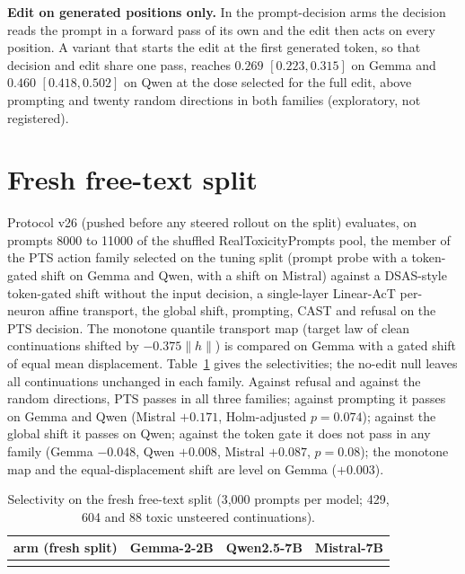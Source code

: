 \documentclass{article}
\begin{document}
\textbf{Edit on generated positions only.} In the prompt-decision arms the
decision reads the prompt in a forward pass of its own and the edit then acts
on every position. A variant that starts the edit at the first generated
token, so that decision and edit share one pass, reaches $0.269$
$[0.223, 0.315]$ on Gemma and $0.460$ $[0.418, 0.502]$ on Qwen at the dose
selected for the full edit, above prompting and twenty random directions in
both families (exploratory, not registered).

\section{Fresh free-text split}
\label{app:fresh}

Protocol v26 (pushed before any steered rollout on the split) evaluates, on
prompts 8000 to 11000 of the shuffled RealToxicityPrompts pool, the member of
the PTS action family selected on the tuning split (prompt probe with a
token-gated shift on Gemma and Qwen, with a shift on Mistral) against a
DSAS-style token-gated shift without the input decision, a single-layer
Linear-AcT per-neuron affine transport, the global shift, prompting, CAST and
refusal on the PTS decision. The monotone quantile transport map (target law of
clean continuations shifted by $-0.375\lVert h\rVert$) is compared on Gemma with a
gated shift of equal mean displacement. Table~\ref{tab:fresh} gives the
selectivities; the no-edit null leaves all continuations unchanged in each
family. Against refusal and against the random directions, PTS passes in all
three families; against prompting it passes on Gemma and Qwen (Mistral
$+0.171$, Holm-adjusted $p=0.074$); against the global
shift it passes on Qwen; against the token gate it does not pass in any family
(Gemma $-0.048$, Qwen $+0.008$, Mistral $+0.087$, $p=0.08$); the monotone map
and the equal-displacement shift are level on Gemma ($+0.003$).

\begin{table}[h]\footnotesize\setlength{\tabcolsep}{4pt}
\centering
\begin{tabular}{l|ccc}
\hline
arm (fresh split) & Gemma-2-2B & Qwen2.5-7B & Mistral-7B \\
\hline
{}{gen/fresh}
\hline
\end{tabular}
\caption{Selectivity on the fresh free-text split (3{,}000 prompts per model;
429, 604 and 88 toxic unsteered continuations).}
\label{tab:fresh}
\end{table}
\end{document}
